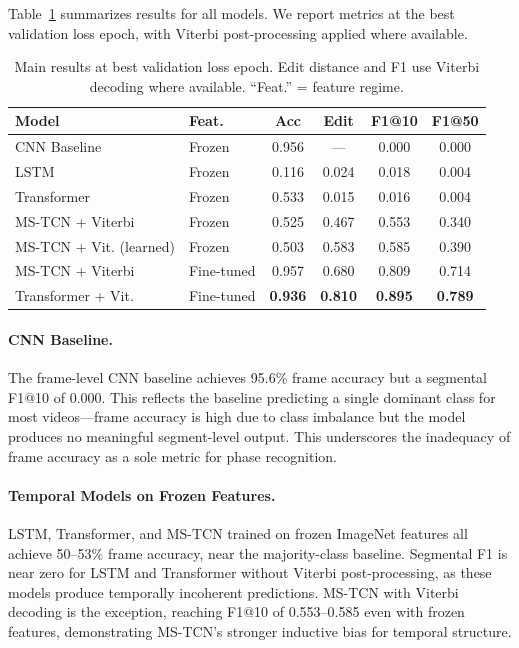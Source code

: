 \documentclass[10pt,twocolumn]{article}
\begin{document}
Table~\ref{tab:main_results} summarizes results for all models. We report metrics at the best validation loss epoch, with Viterbi post-processing applied where available.

\begin{table}[h]
\centering
\small
\setlength{\tabcolsep}{4pt}
\begin{tabular}{llcccc}
\toprule
Model & Feat. & Acc & Edit & F1@10 & F1@50 \\
\midrule
CNN Baseline     & Frozen & 0.956 & ---   & 0.000 & 0.000 \\
LSTM             & Frozen & 0.116 & 0.024 & 0.018 & 0.004 \\
Transformer      & Frozen & 0.533 & 0.015 & 0.016 & 0.004 \\
MS-TCN + Viterbi & Frozen & 0.525 & 0.467 & 0.553 & 0.340 \\
MS-TCN + Vit. (learned) & Frozen & 0.503 & 0.583 & 0.585 & 0.390 \\
\midrule
MS-TCN + Viterbi & Fine-tuned & 0.957 & 0.680 & 0.809 & 0.714 \\
Transformer + Vit. & Fine-tuned & \textbf{0.936} & \textbf{0.810} & \textbf{0.895} & \textbf{0.789} \\
\bottomrule
\end{tabular}
\caption{Main results at best validation loss epoch. Edit distance and F1 use Viterbi decoding where available. ``Feat.'' = feature regime.}
\label{tab:main_results}
\end{table}

\paragraph{CNN Baseline.} The frame-level CNN baseline achieves 95.6\% frame accuracy but a segmental F1@10 of 0.000. This reflects the baseline predicting a single dominant class for most videos—frame accuracy is high due to class imbalance but the model produces no meaningful segment-level output. This underscores the inadequacy of frame accuracy as a sole metric for phase recognition.

\paragraph{Temporal Models on Frozen Features.} LSTM, Transformer, and MS-TCN trained on frozen ImageNet features all achieve 50--53\% frame accuracy, near the majority-class baseline. Segmental F1 is near zero for LSTM and Transformer without Viterbi post-processing, as these models produce temporally incoherent predictions. MS-TCN with Viterbi decoding is the exception, reaching F1@10 of 0.553--0.585 even with frozen features, demonstrating MS-TCN's stronger inductive bias for temporal structure.
\end{document}

